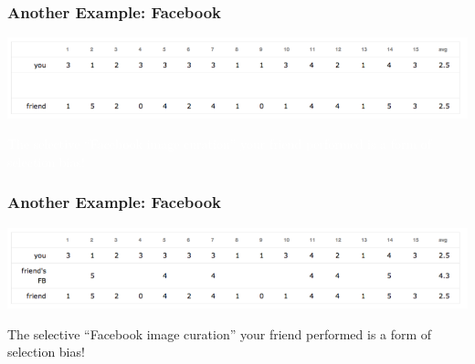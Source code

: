 \documentclass[handout]{beamer}
\begin{document}
\begin{frame}
\frametitle{Another Example: Facebook}

\begin{center}
\includegraphics[width=\textwidth]{./figure/FB3}
\end{center}

\textcolor{white}{The selective ``Facebook image curation'' your friend performed is a form of selection bias!}

\end{frame}


\begin{frame}
\frametitle{Another Example: Facebook}

\begin{center}
\includegraphics[width=\textwidth]{./figure/FB4}
\end{center}

\pause The selective ``Facebook image curation'' your friend performed is a form of selection bias!

\end{frame}
\end{document}
